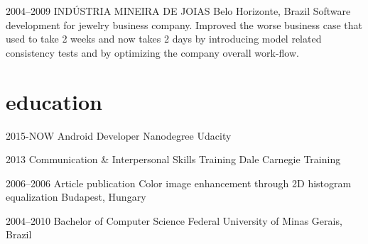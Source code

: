 \documentclass[]{friggeri-cv}
\begin{document}
\begin{entrylist}

 \entry
 {2004--2009}
 {INDÚSTRIA MINEIRA DE JOIAS}
 {Belo Horizonte, Brazil}
 { Software development for jewelry business company.
  Improved the worse business case that used to take 2 weeks and now takes 2 days by introducing model related consistency tests and by optimizing the company overall work-flow. }


\end{entrylist}

\section{education}

\begin{entrylist}
\entry
{2015-NOW}
{Android {\normalfont Developer Nanodegree}}
{Udacity}


\entry
{2013}
{Communication \& Interpersonal {\normalfont Skills Training}}
{Dale Carnegie Training}


\entry
{2006--2006}
{Article publication {\normalfont Color image enhancement through 2D histogram equalization}}
{Budapest, Hungary}


\entry
{2004--2010}
{{\normalfont Bachelor of} Computer Science}
{Federal University of Minas Gerais, Brazil}

\end{entrylist}
\end{document}
